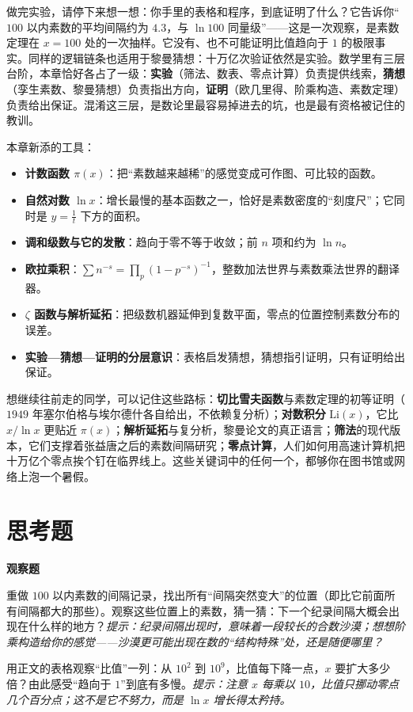 做完实验，请停下来想一想：你手里的表格和程序，到底证明了什么？它告诉你“$100$ 以内素数的平均间隔约为 $4.3$，与 $\ln 100$ 同量级”——这是一次观察，是素数定理在 $x=100$ 处的一次抽样。它没有、也不可能证明比值趋向于 $1$ 的极限事实。同样的逻辑链条也适用于黎曼猜想：十万亿次验证依然是实验。数学里有三层台阶，本章恰好各占了一级：\textbf{实验}（筛法、数表、零点计算）负责提供线索，\textbf{猜想}（孪生素数、黎曼猜想）负责指出方向，\textbf{证明}（欧几里得、阶乘构造、素数定理）负责给出保证。混淆这三层，是数论里最容易掉进去的坑，也是最有资格被记住的教训。

\begin{toolbox}
本章新添的工具：
\begin{itemize}
  \item \textbf{计数函数 $\pi(x)$}：把“素数越来越稀”的感觉变成可作图、可比较的函数。
  \item \textbf{自然对数 $\ln x$}：增长最慢的基本函数之一，恰好是素数密度的“刻度尺”；它同时是 $y=\frac1t$ 下方的面积。
  \item \textbf{调和级数与它的发散}：趋向于零不等于收敛；前 $n$ 项和约为 $\ln n$。
  \item \textbf{欧拉乘积}：$\sum n^{-s}=\prod_{p}(1-p^{-s})^{-1}$，整数加法世界与素数乘法世界的翻译器。
  \item \textbf{$\zeta$ 函数与解析延拓}：把级数机器延伸到复数平面，零点的位置控制素数分布的误差。
  \item \textbf{实验—猜想—证明的分层意识}：表格启发猜想，猜想指引证明，只有证明给出保证。
\end{itemize}
\end{toolbox}

\begin{pandeng}
想继续往前走的同学，可以记住这些路标：\textbf{切比雪夫函数}与素数定理的初等证明（$1949$ 年塞尔伯格与埃尔德什各自给出，不依赖复分析）；\textbf{对数积分} $\mathrm{Li}(x)$，它比 $x/\ln x$ 更贴近 $\pi(x)$；\textbf{解析延拓}与复分析，黎曼论文的真正语言；\textbf{筛法}的现代版本，它们支撑着张益唐之后的素数间隔研究；\textbf{零点计算}，人们如何用高速计算机把十万亿个零点挨个钉在临界线上。这些关键词中的任何一个，都够你在图书馆或网络上泡一个暑假。
\end{pandeng}

\section*{思考题}

\textbf{观察题}
\begin{sikao}
  \item 重做 $100$ 以内素数的间隔记录，找出所有“间隔突然变大”的位置（即比它前面所有间隔都大的那些）。观察这些位置上的素数，猜一猜：下一个纪录间隔大概会出现在什么样的地方？\emph{提示：纪录间隔出现时，意味着一段较长的合数沙漠；想想阶乘构造给你的感觉——沙漠更可能出现在数的“结构特殊”处，还是随便哪里？}
  \item 用正文的表格观察“比值”一列：从 $10^{2}$ 到 $10^{9}$，比值每下降一点，$x$ 要扩大多少倍？由此感受“趋向于 $1$”到底有多慢。\emph{提示：注意 $x$ 每乘以 $10$，比值只挪动零点几个百分点；这不是它不努力，而是 $\ln x$ 增长得太矜持。}
\end{sikao}

